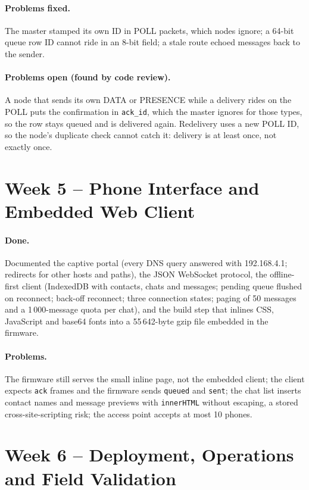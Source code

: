 \documentclass{tietreport}
\begin{document}
\paragraph{Problems fixed.} The master stamped its own ID in POLL
packets, which nodes ignore; a 64-bit queue row ID cannot ride in an
8-bit field; a stale route echoed messages back to the sender.

\paragraph{Problems open (found by code review).} A node that sends
its own DATA or PRESENCE while a delivery rides on the POLL puts the
confirmation in \texttt{ack\_id}, which the master ignores for those
types, so the row stays queued and is delivered again. Redelivery
uses a new POLL ID, so the node's duplicate check cannot catch it:
delivery is at least once, not exactly once.

\section{Week 5 -- Phone Interface and Embedded Web Client}

\paragraph{Done.} Documented the captive portal (every DNS query
answered with 192.168.4.1; redirects for other hosts and paths), the
JSON WebSocket protocol, the offline-first client (IndexedDB with
contacts, chats and messages; pending queue flushed on reconnect;
back-off reconnect; three connection states; paging of 50 messages
and a 1\,000-message quota per chat), and the build step that inlines
CSS, JavaScript and base64 fonts into a 55\,642-byte gzip file
embedded in the firmware.

\paragraph{Problems.} The firmware still serves the small inline page,
not the embedded client; the client expects \texttt{ack} frames and
the firmware sends \texttt{queued} and \texttt{sent}; the chat list
inserts contact names and message previews with \texttt{innerHTML}
without escaping, a stored cross-site-scripting risk; the access
point accepts at most 10 phones.

\section{Week 6 -- Deployment, Operations and Field Validation}
\end{document}
